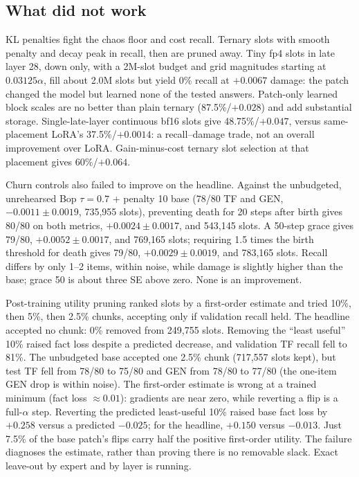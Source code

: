 \documentclass[11pt]{article}
\begin{document}
\subsection{What did not work} KL penalties fight the chaos floor and cost recall. Ternary slots with
smooth penalty and decay peak in recall, then are pruned away. Tiny fp4 slots in late layer 28,
down only, with a 2M-slot budget and grid magnitudes starting at $0.03125\alpha$, fill about 2.0M
slots but yield 0\% recall at $+0.0067$ damage: the patch changed the model but learned none of
the tested answers. Patch-only learned block scales are no better than plain ternary
(87.5\%/$+0.028$) and add substantial storage. Single-late-layer continuous bf16 slots give
48.75\%/$+0.047$, versus same-placement LoRA's 37.5\%/$+0.0014$: a recall--damage trade, not an
overall improvement over LoRA. Gain-minus-cost ternary slot selection at that placement gives
60\%/$+0.064$.

Churn controls also failed to improve on the headline. Against the unbudgeted, unrehearsed
Bop $\tau=0.7$ + penalty 10 base (78/80 TF and GEN, $-0.0011\pm0.0019$, 735,955 slots),
preventing death for 20 steps after birth gives 80/80 on both metrics, $+0.0024\pm0.0017$,
and 543,145 slots. A 50-step grace gives 79/80, $+0.0052\pm0.0017$, and 769,165 slots;
requiring 1.5 times the birth threshold for death gives 79/80, $+0.0029\pm0.0019$, and
783,165 slots. Recall differs by only 1--2 items, within noise, while damage is slightly higher than the base;
grace 50 is about three SE above zero. None is an improvement.

Post-training utility pruning ranked slots by a first-order estimate and tried 10\%, then 5\%,
then 2.5\% chunks, accepting only if validation recall held. The headline accepted no chunk:
0\% removed from 249,755 slots. Removing the ``least useful'' 10\% raised fact loss despite a
predicted decrease, and validation TF recall fell to 81\%. The unbudgeted base accepted one
2.5\% chunk (717,557 slots kept), but test TF fell from 78/80 to 75/80 and GEN from 78/80
to 77/80 (the one-item GEN drop is within noise). The first-order estimate is wrong at a trained
minimum (fact loss $\approx0.01$): gradients are near zero, while reverting a flip is a full-$\alpha$
step. Reverting the predicted least-useful 10\% raised base fact loss by $+0.258$ versus a predicted
$-0.025$; for the headline, $+0.150$ versus $-0.013$. Just 7.5\% of the base patch's flips carry
half the positive first-order utility. The failure diagnoses the estimate, rather than proving
there is no removable slack. Exact leave-out by expert and by layer is running.
\end{document}

